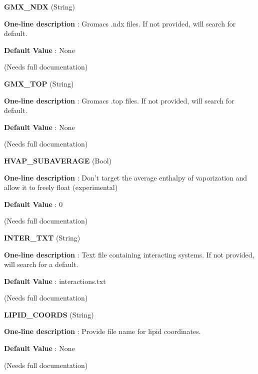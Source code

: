 \begin{DoxyItemize}
\item {\bfseries  G\-M\-X\-\_\-\-N\-D\-X } (String) \par
{\bfseries  One-\/line description }\-: Gromacs .ndx files. If not provided, will search for default. \par
{\bfseries  Default Value }\-: None \par
(Needs full documentation)\end{DoxyItemize}
\begin{DoxyItemize}
\item {\bfseries  G\-M\-X\-\_\-\-T\-O\-P } (String) \par
{\bfseries  One-\/line description }\-: Gromacs .top files. If not provided, will search for default. \par
{\bfseries  Default Value }\-: None \par
(Needs full documentation)\end{DoxyItemize}
\begin{DoxyItemize}
\item {\bfseries  H\-V\-A\-P\-\_\-\-S\-U\-B\-A\-V\-E\-R\-A\-G\-E } (Bool) \par
{\bfseries  One-\/line description }\-: Don't target the average enthalpy of vaporization and allow it to freely float (experimental) \par
{\bfseries  Default Value }\-: 0 \par
(Needs full documentation)\end{DoxyItemize}
\begin{DoxyItemize}
\item {\bfseries  I\-N\-T\-E\-R\-\_\-\-T\-X\-T } (String) \par
{\bfseries  One-\/line description }\-: Text file containing interacting systems. If not provided, will search for a default. \par
{\bfseries  Default Value }\-: interactions.\-txt \par
(Needs full documentation)\end{DoxyItemize}
\begin{DoxyItemize}
\item {\bfseries  L\-I\-P\-I\-D\-\_\-\-C\-O\-O\-R\-D\-S } (String) \par
{\bfseries  One-\/line description }\-: Provide file name for lipid coordinates. \par
{\bfseries  Default Value }\-: None \par
(Needs full documentation)\end{DoxyItemize}
